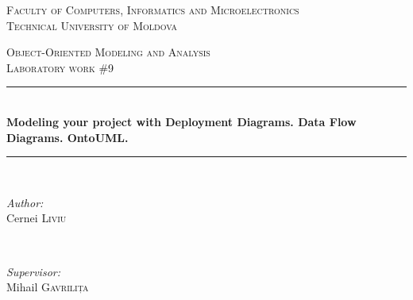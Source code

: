 \documentclass[12pt,a4paper,titlepage]{article}
\begin{document}
\begin{titlepage}

  \begin{center} %

  \textsc{\large Faculty of Computers, Informatics and Microelectronics}\\[0.5cm]
  \textsc{\large Technical University of Moldova}\\[1.2cm] %
  \vspace{25 mm}

  \textsc{\Large Object-Oriented Modeling and Analysis}\\[0.5cm] %
  \textsc{\large Laboratory work \#9}\\[0.5cm] %

\newcommand{\HRule}{\rule{\linewidth}{0.5mm}} %

  \vspace{10 mm}
  \HRule \\[0.4cm]
  { \LARGE \bfseries Modeling your project with Deployment Diagrams. Data Flow Diagrams. OntoUML. }\\[0.4cm] %
  \HRule \\[1.5cm]

      \vspace{30mm}

      \begin{minipage}{0.4\textwidth}
      \begin{flushleft} \large
      \emph{Author:}\\
      Cernei \textsc{Liviu}
      \end{flushleft}
      \end{minipage}
      ~
      \begin{minipage}{0.4\textwidth}
      \begin{flushright} \large
      \emph{Supervisor:} \\
      Mihail \textsc{Gavrilița} %
      \end{flushright}
      \end{minipage}\\[4cm]


\end{center}
\end{titlepage}
\end{document}

